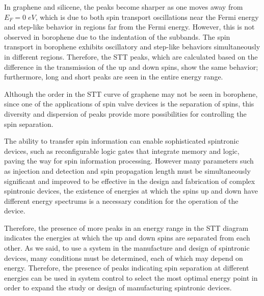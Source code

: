 \documentclass[twoside,twocolumn,9pt]{article}
\begin{document}
In graphene and silicene, the peaks become sharper as one moves away from $E_F = 0\;eV$, which is due to both spin transport oscillations near the Fermi energy and step-like behavior in regions far from the Fermi energy. However, this is not observed in borophene due to the indentation of the subbands. The spin transport in borophene exhibits oscillatory and step-like behaviors simultaneously in different regions. Therefore, the STT peaks, which are calculated based on the difference in the transmission of the up and down spins, show the same behavior; furthermore, long and short peaks are seen in the entire energy range.

Although the order in the STT curve of graphene may not be seen in borophene, since one of the applications of spin valve devices is the separation of spins, this diversity and dispersion of peaks provide more possibilities for controlling the spin separation.

The ability to transfer spin information can enable sophisticated spintronic devices, such as reconfigurable logic gates that integrate memory and logic, paving the way for spin information processing. However  many parameters such as injection and detection and spin propagation length must be simultaneously significant and improved to be effective in the design and fabrication of complex spintronic devices, the existence of energies at which the spins up and down have different energy spectrums is a necessary condition for the operation of the device\cite{seneor2012spintronics, zhou2016spin}.

Therefore, the presence of more peaks in an energy range in the STT diagram indicates the energies at which the up and down spins are separated from each other. As we said, to use a system in the manufacture and design of spintronic devices, many conditions must be determined, each of which may depend on energy. Therefore, the presence of peaks indicating spin separation at different energies can be used in system control to select the most optimal energy point in order to expand the study or design of manufacturing spintronic devices.
\end{document}
